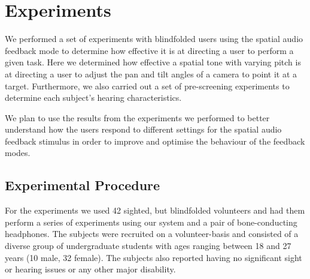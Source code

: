 \documentclass[format=sigconf, review=true, screen=true, anonymous=true]{acmart}
\begin{document}
\section{Experiments}
\label{sec:experiments}

We performed a set of experiments with blindfolded users using the spatial audio feedback mode to determine how effective it is at directing a user to perform a given task. Here we determined how effective a spatial tone with varying pitch is at directing a user to adjust the pan and tilt angles of a camera to point it at a target. Furthermore, we also carried out a set of pre-screening experiments to determine each subject's hearing characteristics. %

We plan to use the results from the experiments we performed to better understand how the users respond to different settings for the spatial audio feedback stimulus in order to improve and optimise the behaviour of the feedback modes.




\subsection{Experimental Procedure}

For the experiments we used 42 sighted, but blindfolded volunteers and had them perform a series of experiments using our system and a pair of bone-conducting headphones. The subjects were recruited on a volunteer-basis and consisted of a diverse group of undergraduate students with ages ranging between 18 and 27 years (10 male, 32 female). The subjects also reported having no significant sight or hearing issues or any other major disability. 
\end{document}
